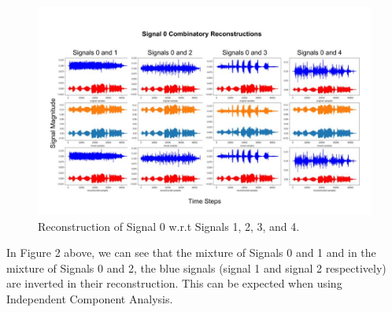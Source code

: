 \documentclass[12pt]{article}
\begin{document}
\begin{figure}[!htb] %
  \centering
  \includegraphics[width = 0.9\linewidth]{signals_0.jpg}
  \caption{Reconstruction of Signal 0 w.r.t Signals 1, 2, 3, and 4.}
\end{figure}
\FloatBarrier
\bigbreak
\noindent
In Figure 2 above, we can see that the mixture of Signals 0 and 1 and in the mixture of Signals 0 and 2, the blue signals (signal 1 and signal 2 respectively) are inverted in their reconstruction. This can be expected when using Independent Component Analysis. 
\end{document}
